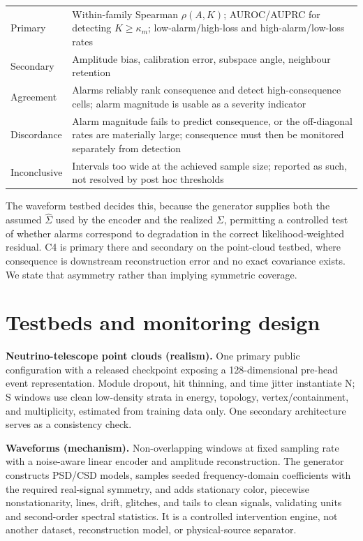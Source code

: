 \documentclass[10pt,twocolumn]{extarticle}
\begin{document}
\begin{center}
\scriptsize
{}
\begin{tabularx}{\columnwidth}{@{}p{0.60in}Y@{}}
\toprule
Primary & Within-family Spearman $\rho(A,K)$; AUROC/AUPRC for detecting
$K\geq\kappa_m$; low-alarm/high-loss and high-alarm/low-loss rates \\
Secondary & Amplitude bias, calibration error, subspace angle, neighbour
retention \\
\midrule
Agreement & Alarms reliably rank consequence and detect high-consequence
cells; alarm magnitude is usable as a severity indicator \\
Discordance & Alarm magnitude fails to predict consequence, or the
off-diagonal rates are materially large; consequence must then be monitored
separately from detection \\
Inconclusive & Intervals too wide at the achieved sample size; reported as
such, not resolved by post hoc thresholds \\
\bottomrule
\end{tabularx}
\label{tab:c4}
\vspace{-0.3em}
\end{center}

The waveform testbed decides this, because the generator supplies both the
assumed $\hat\Sigma$ used by the encoder and the realized $\Sigma$, permitting a
controlled test of whether alarms correspond to degradation in the correct
likelihood-weighted residual. C4 is primary there and secondary on the
point-cloud testbed, where consequence is downstream reconstruction error and
no exact covariance exists. We state that asymmetry rather than implying
symmetric coverage.

\section{Testbeds and monitoring design}

\textbf{Neutrino-telescope point clouds (realism).} One primary public
configuration with a released checkpoint exposing a 128-dimensional pre-head
event representation. Module dropout, hit thinning, and time jitter instantiate
N; S windows use clean low-density strata in energy, topology,
vertex/containment, and multiplicity, estimated from training data only. One
secondary architecture serves as a consistency check.

\textbf{Waveforms (mechanism).} Non-overlapping windows at fixed sampling rate
with a noise-aware linear encoder and amplitude reconstruction. The generator
constructs PSD/CSD models, samples seeded frequency-domain coefficients with
the required real-signal symmetry, and adds stationary color, piecewise
nonstationarity, lines, drift, glitches, and tails to clean signals, validating
units and second-order spectral statistics. It is a controlled intervention
engine, not another dataset, reconstruction model, or physical-source
separator.
\end{document}
